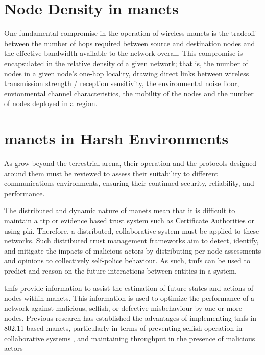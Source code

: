 \section{Node Density in \glspl{manet}}

One fundamental compromise in the operation of wireless \glspl{manet} is the tradeoff between the number of hops required between source and destination nodes and the effective bandwidth available to the network overall\cite{Royer2001}.
This compromise is encapsulated in the relative density of a given network; that is, the number of nodes in a given node's one-hop locality, drawing direct links between wireless transmission strength / reception sensitivity, the environmental noise floor, envionmental channel characteristics, the mobility of the nodes and the number of nodes deployed in a region.



\section{\glspl{manet} in Harsh Environments}

As  grow beyond the terrestrial arena, their operation and the protocols designed around them must be reviewed to assess their suitability to different communications environments, ensuring their continued security, reliability, and performance.

The distributed and dynamic nature of \glspl{manet} mean that it is difficult to maintain a \gls{ttp} or evidence based trust system such as Certificate Authorities or using \gls{pki}.
Therefore, a distributed, collaborative system must be applied to these networks.
Such distributed trust management frameworks aim to detect, identify, and mitigate the impacts of malicious actors by distributing per-node assessments and opinions to collectively self-police behaviour.
As such, \glspl{tmf} can be used to predict and reason on the future interactions between entities in a system.

\glspl{tmf} provide information to assist the estimation of future states and actions of nodes within \glspl{manet}.
This information is used to optimize the performance of a network against malicious, selfish, or defective misbehaviour by one or more nodes.
Previous research has established the advantages of implementing \glspl{tmf} in 802.11 based \glspl{manet}, particularly in terms of preventing selfish operation in collaborative systems \cite{Li2007}, and maintaining throughput in the presence of malicious actors \cite{Buchegger2002}

